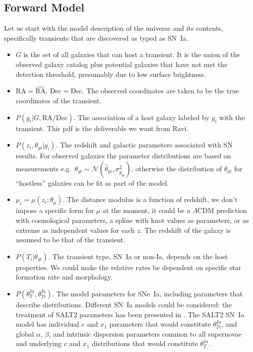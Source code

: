\documentclass[preprint]{aastex}
\begin{document}
\subsection{Forward Model}
Let us start with the model description of the universe and its contents, specifically transients
that are discovered as typed as SN~Ia.
\begin{itemize}
\item $G$ is the set of all galaxies that can host a transient.  It is
the union of the observed galaxy catalog plus potential galaxies that have not
met the detection threshold, presumably due to low surface brightness.
\item $\text{RA}=\hat{\text{RA}}$, $\text{Dec} =\hat{\text{Dec}}$.  The observed
coordinates are taken to be the true coordinates of the transient.
\item $P(g_i | G, \text{RA/Dec})$. 
The association of a host galaxy labeled by $g_i$ with the transient.
This pdf is
the deliverable we want from Ravi.
\item $P(z_i, \theta_{gi} | g_i)$. 
The redshift and galactic parameters associated with SN results.
For observed galaxies the parameter distributions 
are based on measurements e.g.\ $\theta_{gi} \sim \mathcal{N}(\hat{\theta}_{gi},\sigma^2_{\hat{\theta}_{gi}})$, otherwise the distribution
of $\theta_{gi}$ for ``hostless'' galaxies can be fit as part of the model.
\item $\mu_i=\mu(z_i; \theta_\mu)$.  The distance modulus is a function of redshift,
we don't impose a specific form for  $\mu$ at the moment,  it could
be a $\Lambda$CDM prediction with cosmological parameters, a spline with knot values
as parameters, or as extreme as independent values for each $z$.
The redshift of the galaxy is assumed to be that of the transient.
\item $P(T_i | \theta_{gi})$.  The transient type, SN~Ia or non-Ia, depends
on the host properties.  We could make the relative rates be dependent
on specific star formation rate and morphology.
\item $P(\theta_T^{Ia}, \theta_{Ti}^{Ia})$.  The model parameters for SNe~Ia, including
parameters that describe distributions.
Different SN~Ia models could be considered: the treatment of SALT2 parameters
has been presented in \citet{2011MNRAS.418.2308M}.
The SALT2 SN~Ia
model has individual $c$ and $x_1$ parameters that would constitute $\theta_{Ti}^{Ia}$,
and global $\alpha$, $\beta$, and intrinsic dispersion  parameters  common to all supernovae
 and  underlying  $c$ and $x_1$ distributions that would constitute $\theta_T^{Ia}$.

\end{itemize}
\end{document}
